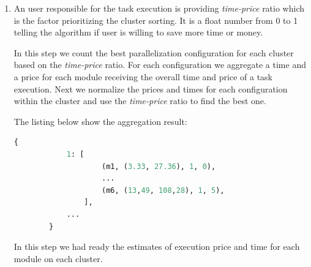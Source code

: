 \documentclass{article}
\begin{document}
\begin{enumerate}
\begin{itemize}
			So as a result we get the internal flow coefficient (\textit{IFC}) in range [0, 1] the value of which reflects the ratio of internal data flow between modules time and the task execution time. If there is no need for modules to be executed in sequence (one after another), it is possible that later modules will be executed in parallel with the earlier ones. This is shown in Figure~\ref{fig:timeline_2}. In such a case the \textit{IFC} will be significantly lower. Even though, it is possible to count the \textit{IFC} for such a cases taking into the account the task execution configuration. Having the IFC for a task we just multiply each estimated module execution time by factor 1 + \textit{IFC}.
			\item Other approximation of the internal data flow time by looking at the historical data of modules executions.
		\end{itemize}
		\item An user responsible for the task execution is providing \textit{time-price} ratio which is the factor prioritizing the cluster sorting. It is a float number from 0 to 1 telling the algorithm if user is willing to save more time or money.
		
		In this step we count the best parallelization configuration for each cluster based on the \textit{time-price} ratio. For each configuration we aggregate a time and a price for each module receiving the overall time and price of a task execution. Next we normalize the prices and times for each configuration within the cluster and use the \textit{time-price} ratio to find the best one.
		
		The listing below show the aggregation result: 
		\begin{lstlisting}[language=Python]
		{
			1: [
					(m1, (3.33, 27.36), 1, 0),
					...
					(m6, (13,49, 108,28), 1, 5),
				],
			...
		}
		\end{lstlisting}
		In this step we had ready the estimates of execution price and time for each module on each cluster.
	

\end{enumerate}
\end{document}
